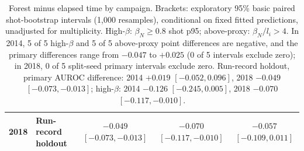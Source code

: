 \begin{table}[t]
\begin{tabular}{@{}llccc@{}}
2018 & Run-record holdout & $-0.049$ {\scriptsize $[-0.073, -0.013]$} & $-0.070$ {\scriptsize $[-0.117, -0.010]$} & $-0.057$ {\scriptsize $[-0.109, 0.011]$} \\
\bottomrule
\end{tabular}
\caption{Forest minus elapsed time by campaign. Brackets: exploratory 95\% basic paired shot-bootstrap intervals (1,000 resamples), conditional on fixed fitted predictions, unadjusted for multiplicity. High-$\beta$: $\beta_N\geq0.8$ shot p95; above-proxy: $\beta_N/l_i>4$. In 2014, 5 of 5 high-$\beta$ and 5 of 5 above-proxy point differences are negative, and the primary differences range from $-0.047$ to $+0.025$ (0 of 5 intervals exclude zero); in 2018, 0 of 5 split-seed primary intervals exclude zero. Run-record holdout, primary AUROC difference: 2014 $+0.019$ $[-0.052, 0.096]$, 2018 $-0.049$ $[-0.073, -0.013]$; high-$\beta$: 2014 $-0.126$ $[-0.245, 0.005]$, 2018 $-0.070$ $[-0.117, -0.010]$.}
\end{table}
